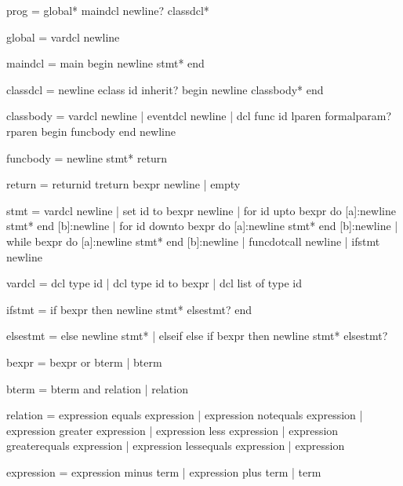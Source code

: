     prog        =   global* maindcl newline? classdcl*

    global      =   vardcl newline

    maindcl     =   main begin newline stmt* end

    classdcl    =   newline eclass id inherit? begin newline classbody* end

    classbody   =   vardcl newline                                                            
                |   eventdcl newline                                                
                |   dcl func id lparen formalparam? rparen begin funcbody end newline

    funcbody    =   newline stmt* return

    return      =   {returnid} treturn bexpr newline
                |   {empty}                                                 


    stmt        =   vardcl newline                      
                |   set id to bexpr newline               
                |   for id upto bexpr do [a]:newline stmt* end [b]:newline 
                |   for id downto bexpr do [a]:newline stmt* end [b]:newline
                |   while bexpr do [a]:newline stmt* end [b]:newline  
                |   funcdotcall newline         
                |   ifstmt newline                      

    vardcl      =   dcl type id         
                |   dcl type id to bexpr      
                |   dcl list of type id      

    ifstmt      =   if bexpr then newline stmt* elsestmt? end

    elsestmt    =   else newline stmt*
                |   {elseif} else if bexpr then newline stmt* elsestmt?


    bexpr       =   bexpr or bterm             
                |   bterm                   

    bterm       =   bterm and relation 
                |   relation

    relation    =   expression equals expression
                |   expression notequals expression
                |   expression greater expression
                |   expression less expression       
                |   expression greaterequals expression 
                |   expression lessequals expression   
                |   expression 

    expression  =   expression minus term
                |   expression plus term
                |   term


